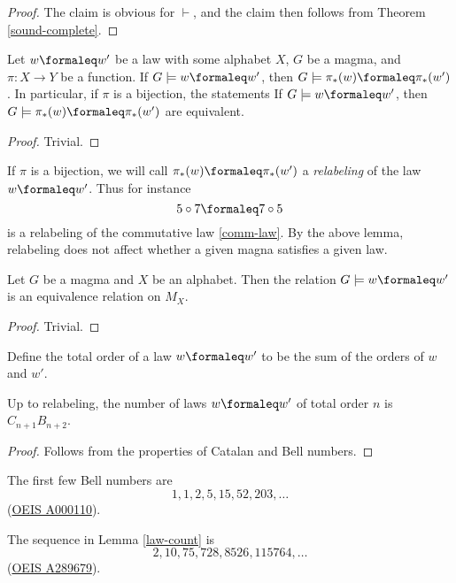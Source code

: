 \begin{proof} The claim is obvious for $\vdash$, and the claim then follows from Theorem \ref{sound-complete}.
\end{proof}


\begin{lemma}[Pushforward]\label{push}  Let $w \formaleq w'$ be a law with some alphabet $X$, $G$ be a magma, and $\pi: X \to Y$ be a function.  If $G \models w \formaleq w'$, then $G \models \pi_*(w) \formaleq \pi_*(w')$.  In particular, if $\pi$ is a bijection, the statements If $G \models w \formaleq w'$, then $G \models \pi_*(w) \formaleq \pi_*(w')$ are equivalent.
\end{lemma}

\begin{proof}  Trivial.
\end{proof}

If $\pi$ is a bijection, we will call $\pi_*(w) \formaleq \pi_*(w')$ a \emph{relabeling} of the law $w \formaleq w'$.  Thus for instance
$$ 5 \circ 7 \formaleq 7 \circ 5$$
is a relabeling of the commutative law \eqref{comm-law}.  By the above lemma, relabeling does not affect whether a given magna satisfies a given law.

\begin{lemma}[Equivalence]\label{equiv}  Let $G$ be a magma and $X$ be an alphabet.  Then the relation $G \models w \formaleq w'$ is an equivalence relation on $M_X$.
\end{lemma}

\begin{proof}  Trivial.
\end{proof}

Define the total order of a law $w \formaleq w'$ to be the sum of the orders of $w$ and $w'$.

\begin{lemma}\label{law-count}  Up to relabeling, the number of laws $w \formaleq w'$ of total order $n$ is $C_{n+1} B_{n+2}$.
\end{lemma}

\begin{proof} Follows from the properties of Catalan and Bell numbers.
\end{proof}

The first few Bell numbers are
$$ 1, 1, 2, 5, 15, 52, 203, \dots$$
(\href{https://oeis.org/A000110}{OEIS A000110}).

The sequence in Lemma \ref{law-count} is
$$ 2, 10, 75, 728, 8526, 115764, \dots$$
(\href{https://oeis.org/A289679}{OEIS A289679}).

